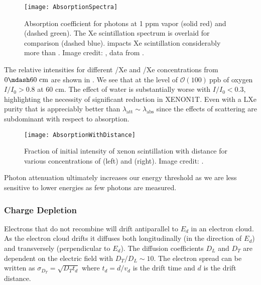 \begin{figure}
\centering
\texttt{[image: AbsorptionSpectra]}
\caption{Absorption coefficient for photons at 1 ppm  vapor (solid red) and  (dashed green).  The Xe scintillation
spectrum is overlaid for comparison (dashed blue).   impacts Xe scintillation considerably
more than .  Image credit: ,  data from .}
\label{fig:importance_procedure_effects_photons_absorption_coefficents}
\end{figure}

The relative intensities for different /Xe and /Xe concentrations from $0 \mdash 60\ \mathrm{cm}$ are shown in
.  We see that at the level of $\mathcal{O}(100)\ \mathrm{ppb}$ of
oxygen $I / I_0 > 0.8$ at 60 cm.  The effect of water is substantially worse with $I / I_0 < 0.3$, highlighting the necessity of
significant reduction in XENON1T.  Even with a LXe purity that is appreciably better than
 $\lambda_{\mathrm{att}} \sim \lambda_{\mathrm{abs}}$ since
the effects of scattering are subdominant with respect to absorption.

\begin{figure}
\centering
\texttt{[image: AbsorptionWithDistance]}
\caption{Fraction of initial intensity of xenon scintillation with distance for various concentrations of \htwoo (left) and \otwo
(right).  Image credit: .}
\label{fig:importance_procedure_effects_photons_absorption_distance}
\end{figure}

Photon attenuation ultimately increases our energy threshold as we are less sensitive to lower energies as few photons are
measured.



\subsubsection{Charge Depletion}
\label{subsubsec:importance_procedure_effects_charge}
Electrons that do not recombine will drift antiparallel to $E_d$ in an electron cloud.  As the electron cloud drifts it diffuses both
longitudinally (in the direction of $E_{d}$) and transversely (perpendicular to $E_{d}$).  The
diffusion coefficients $D_{L}$ and $D_{T}$ are dependent on the electric field with $D_{T}/D_{L} \sim 10$.  The electron spread can
be written as $\sigma_{D_{T}} = \sqrt{D_{T} t_{d}}$ where $t_{d} = d/v_{d}$ is the drift time and $d$ is the drift distance.

